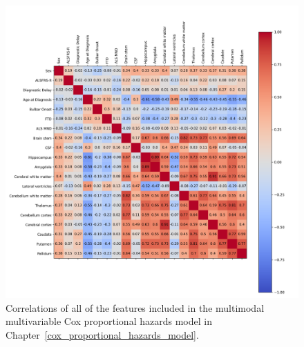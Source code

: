 {}

\appendix

\begin{figure}
    \centering
    \includegraphics[width=\textwidth]{figures/multimodal_correlation}
    \caption{Correlations of all of the features included in the multimodal multivariable Cox proportional hazards model in Chapter~\ref{cox_proportional_hazards_model}.}
    \label{fig:multimodalcorrelations}
\end{figure}

%
%
%

